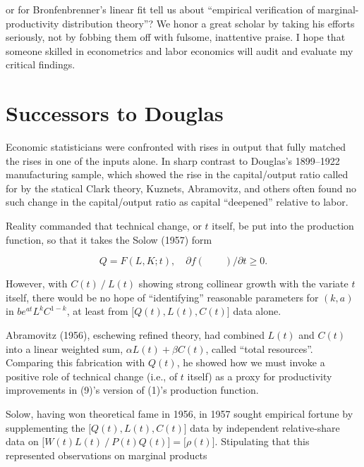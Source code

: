\documentclass{article}
\begin{document}
{or for Bronfenbrenner's linear fit tell us about ``empirical verification of marginal-productivity distribution theory''?} We honor a great scholar by %
taking his efforts seriously, not by fobbing them off with fulsome, inattentive praise. I hope that someone skilled in econometrics and labor economics will audit and evaluate my critical findings.

\section*{Successors to Douglas}

Economic statisticians were confronted with rises in output that fully matched the rises in one of the inputs alone. In sharp contrast to Douglas's 1899--1922 manufacturing sample, which showed the rise in the capital/output ratio called for by the statical Clark theory, Kuznets, Abramovitz, and others often found no such change in the capital/output ratio as capital ``deepened'' relative to labor.

Reality commanded that technical change, or \(t\) itself, be put into the production function, so that it takes the Solow (1957) form

\begin{equation}\label{eq9}
Q=F(L,K;t),\quad\partial f(\qquad)/\partial t \ge 0.%
\end{equation}


However, with \(C(t)⁄L(t)\) showing strong collinear growth with the variate \(t\) itself, there would be no hope of ``identifying'' reasonable parameters for \((k,a)\) in \(be^{at} L^kC^{1-k}\), at least from \(\lbrack Q(t),L(t),C(t)\rbrack\) data alone.

Abramovitz (1956), eschewing refined theory, had combined \(L(t)\) and \(C(t)\) into a linear weighted sum, \(\alpha L(t)+\beta C(t)\), called ``total resources''. Comparing this fabrication with \(Q(t)\), he showed how we must invoke a positive role of technical change (i.e., of \(t\) itself) as a proxy for productivity improvements in (9)'s version of (1)'s production function.

Solow, having won theoretical fame in 1956, in 1957 sought empirical fortune by supplementing the \(\lbrack Q(t),L(t),C(t)\rbrack\) data by independent relative-share data on \( \lbrack W(t) L(t)⁄P(t) Q(t) \rbrack=\lbrack \rho(t)\rbrack\). Stipulating that this represented observations on marginal products
\end{document}
